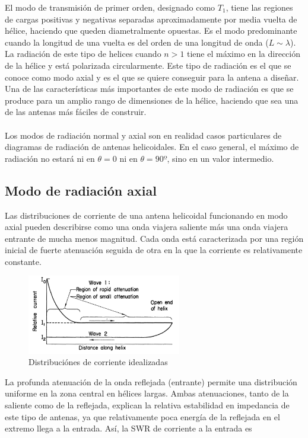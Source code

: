 \documentclass[12pt]{article}
\begin{document}
El modo de transmisión de primer orden, designado como $T_{1}$, tiene las regiones de cargas positivas y negativas separadas aproximadamente por media vuelta de hélice, haciendo que queden diametralmente opuestas. Es el modo predominante cuando la longitud de una vuelta es del orden de una longitud de onda ($L\sim\lambda$). La radiación de este tipo de helices cuando $n>1$ tiene el máximo en la dirección de la hélice y está polarizada circularmente. Este tipo de radiación es el que se conoce como modo axial y es el que se quiere conseguir para la antena a diseñar. Una de las características más importantes de este modo de radiación es que se produce para un amplio rango de dimensiones de la hélice, haciendo que sea una de las antenas más fáciles de construir.\\\\
Los modos de radiación normal y axial son en realidad casos particulares de diagramas de radiación de antenas helicoidales. En el caso general, el máximo de radiación no estará ni en $\theta=0$ ni en $\theta=90º$, sino en un valor intermedio.

\subsection{Modo de radiación axial}
Las distribuciones de corriente de una antena helicoidal funcionando en modo axial pueden describirse como una onda viajera saliente más una onda viajera entrante de mucha menos magnitud. Cada onda está caracterizada por una región inicial de fuerte atenuación seguida de otra en la que la corriente es relativamente constante.\\

\begin{figure}[!h]
	\centering
	\includegraphics[width=0.6\textwidth]{ondas.png}
	\caption{Distribuciónes de corriente idealizadas}
	\label{fig:waves}
\end{figure}

La profunda atenuación de la onda reflejada (entrante) permite una distribución uniforme en la zona central en hélices largas. Ambas atenuaciones, tanto de la saliente como de la reflejada, explican la relativa estabilidad en impedancia de este tipo de antenas, ya que relativamente poca energía de la reflejada en el extremo llega a la entrada. Así, la SWR de corriente a la entrada es
\end{document}
